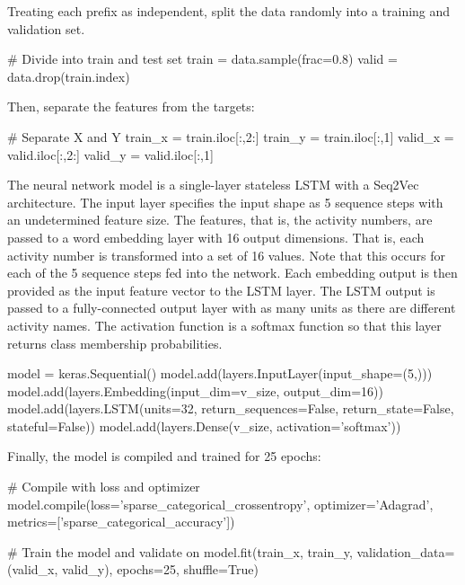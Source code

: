 \begin{withcode}
Treating each prefix as independent, split the data randomly into a training and validation set. 

\begin{pythoncode}
# Divide into train and test set
train = data.sample(frac=0.8)
valid = data.drop(train.index)
\end{pythoncode}

Then, separate the features from the targets:

\begin{pythoncode}
# Separate X and Y
train_x = train.iloc[:,2:]
train_y = train.iloc[:,1]
valid_x = valid.iloc[:,2:]
valid_y = valid.iloc[:,1]
\end{pythoncode}

The neural network model is a single-layer stateless LSTM with a Seq2Vec architecture. The input layer specifies the input shape as 5 sequence steps with an undetermined feature size. The features, that is, the activity numbers, are passed to a word embedding layer with 16 output dimensions. That is, each activity number is transformed into a set of 16 values. Note that this occurs for each of the 5 sequence steps fed into the network. Each embedding output is then provided as the input feature vector to the LSTM layer. The LSTM output is passed to a fully-connected output layer with as many units as there are different activity names. The activation function is a softmax function so that this layer returns class membership probabilities. 

\begin{pythoncode}
model = keras.Sequential()
model.add(layers.InputLayer(input_shape=(5,)))
model.add(layers.Embedding(input_dim=v_size, output_dim=16))
model.add(layers.LSTM(units=32,
    return_sequences=False, return_state=False, stateful=False))
model.add(layers.Dense(v_size, activation='softmax'))
\end{pythoncode}

Finally, the model is compiled and trained for 25 epochs:

\begin{pythoncode}
# Compile with loss and optimizer
model.compile(loss='sparse_categorical_crossentropy',
              optimizer='Adagrad',
              metrics=['sparse_categorical_accuracy'])

# Train the model and validate on
model.fit(train_x, train_y,
          validation_data=(valid_x, valid_y),
          epochs=25, shuffle=True)
\end{pythoncode}


\end{withcode}

